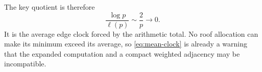 The key quotient is therefore
\begin{equation}
\frac{\log p}{\ell(p)}\sim\frac2p\longrightarrow0.
\label{eq:mean-clock}
\end{equation}
It is the average edge clock forced by the arithmetic total.  No roof
allocation can make its minimum exceed its average, so
\eqref{eq:mean-clock} is already a warning that the expanded computation and
a compact weighted adjacency may be incompatible.
